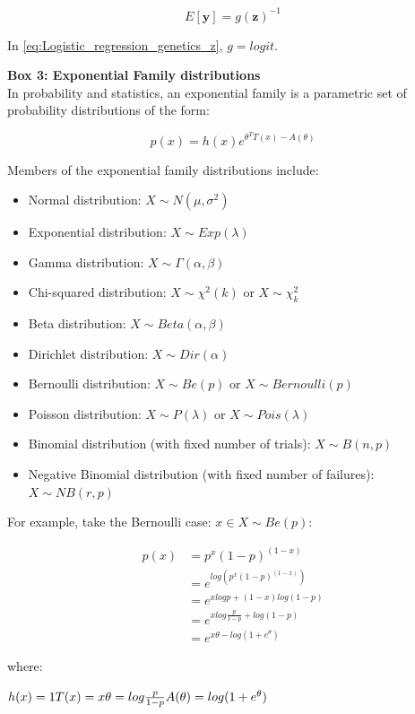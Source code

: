 \begin{equation*}
 E[\mathbf{y}] = g(\mathbf{z})^{-1} 
\end{equation*}

In \eqref{eq:Logistic_regression_genetics_z}, $ g = logit $.



\newpage

\begin{Comment}
\hspace{-2.5mm}\textbf{Box 3: Exponential Family distributions}\label{box3}\\
In probability and statistics, an exponential family is a parametric set of probability distributions of the form:

\begin{equation*}
    p(x) = h(x)e^{\theta^TT(x)-A(\theta)}
\end{equation*}

Members of the exponential family distributions include:
\begin{itemize}
    \item Normal distribution: $X \sim N(\mu,\sigma^2)$
    \item Exponential distribution: $ X \sim Exp(\lambda)$
    \item Gamma distribution: $ X \sim \Gamma(\alpha,\beta)$
    \item Chi-squared distribution: $ X \sim \chi^2 (k)$ or $ X \sim \chi_k^2$
    \item Beta distribution: $ X \sim Beta(\alpha,\beta)$
    \item Dirichlet distribution: $ X \sim Dir(\alpha)$
    \item Bernoulli distribution: $ X \sim Be(p)$ or $ X \sim Bernoulli(p)$
    \item Poisson distribution: $ X \sim P(\lambda)$ or $ X \sim Pois(\lambda)$
    \item Binomial distribution (with fixed number of trials): $ X \sim B(n,p)$
    \item Negative Binomial distribution (with fixed number of failures): $ X \sim NB(r,p)$\\
\end{itemize}

For example, take the Bernoulli case: $x \in X \sim Be(p)$:

\begin{equation*}
\begin{split}
    p(x) & = p^x(1-p)^{(1-x)}\\
         & = e^{log(p^x(1-p)^{(1-x)})}\\
         & = e^{xlogp + (1-x)log(1-p)}\\
         & = e^{xlog\frac{p}{1-p}+log(1-p)}\\
         & = e^{x\theta - log(1+e^\theta)}
\end{split}
\end{equation*}

where: 

\hfill $h(x)=1 \hfill T(x)=x \hfill \theta = log \frac{p}{1-p} \hfill A(\theta) = log(1+e^\theta)$ \hfill

\end{Comment}

